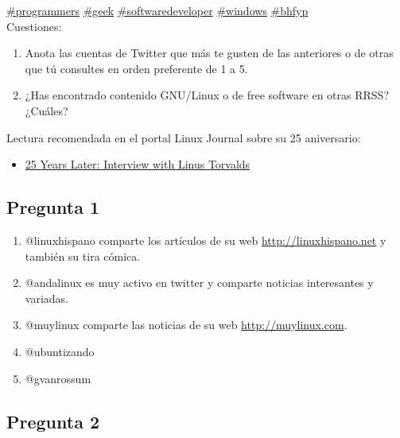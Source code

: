 \begin{center}
{{    \href{https://twitter.com/hashtag/programmers}{\#programmers}
    \href{https://twitter.com/hashtag/geek}{\#geek}
    \href{https://twitter.com/hashtag/softwaredeveloper}{\#softwaredeveloper}
    \href{https://twitter.com/hashtag/windows}{\#windows}
    \href{https://twitter.com/hashtag/bhfyp}{\#bhfyp}
    \\ Cuestiones:
    \begin{enumerate}
    \item Anota las cuentas de Twitter que más te gusten de las anteriores o de otras que tú consultes en orden preferente de 1 a 5.
    \item ¿Has encontrado contenido GNU/Linux o de free software en otras RRSS? ¿Cuáles?
    \end{enumerate}
    Lectura recomendada en el portal Linux Journal sobre su 25 aniversario:
    \begin{itemize}
        \item \href{https://www.linuxjournal.com/content/25-years-later-interview-linus-torvalds}{25 Years Later: Interview with Linus Torvalds}
    \end{itemize}
    }}
\end{center}

\subsection{Pregunta 1}

\begin{enumerate}
    \item @linuxhispano comparte los artículos de su web \url{http://linuxhispano.net} y también su tira cómica.
    \item @andalinux es muy activo en twitter y comparte noticias interesantes y variadas.
    \item @muylinux comparte las noticias de su web \url{http://muylinux.com}.
    \item @ubuntizando
    \item @gvanrossum
\end{enumerate}

\subsection{Pregunta 2}

